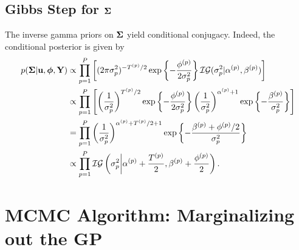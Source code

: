 \documentclass[12pt]{article}
\newcommand{\bphi}{\boldsymbol{\phi}}
\begin{document}
\subsection{Gibbs Step for $\boldsymbol{\Sigma}$}
The inverse gamma priors on $\boldsymbol{\Sigma}$ yield conditional conjugacy. Indeed, the conditional posterior is given by 
\begin{align*}
p(\CovObs | \bpar, \bphi, \stateMat) 
&\propto \prod_{\objIdx=1}^{\Nobj} \left[(2\pi\sdObs^2_{\objIdx})^{-\indexObj{\Ntime}/2} \exp\left\{-\frac{\indexObj{\phi} }{2\sdObs^2_{\objIdx}} \right\} 
\mathcal{IG}(\sdObs^2_{\objIdx}| \indexObj{\IGShape}, \indexObj{\IGScale}) \right] \\
&\propto \prod_{\objIdx=1}^{\Nobj} \left[\left(\frac{1}{\sdObs^2_{\objIdx}}\right)^{\indexObj{\Ntime}/2} \exp\left\{-\frac{\indexObj{\phi} }{2\sdObs^2_{\objIdx}} \right\} 
 \left(\frac{1}{\sdObs^2_{\objIdx}}\right)^{\indexObj{\IGShape}+1} \exp\left\{-\frac{\indexObj{\IGScale}}{\sdObs^2_{\objIdx}} \right\}\right] \\
 &= \prod_{\objIdx=1}^{\Nobj} \left(\frac{1}{\sdObs^2_{\objIdx}}\right)^{\indexObj{\IGShape}+\indexObj{\Ntime}/2+1} \exp\left\{-\frac{\indexObj{\IGScale} + \indexObj{\phi}/2}{\sdObs^2_{\objIdx}} \right\} \\
 &\propto \prod_{\objIdx=1}^{\Nobj} \mathcal{IG}\left(\sdObs^2_{\objIdx} \bigg| \indexObj{\IGShape} + \frac{\indexObj{\Ntime}}{2}, \indexObj{\IGScale} + \frac{\indexObj{\phi}}{2} \right).
\end{align*}


\section{MCMC Algorithm: Marginalizing out the GP}
\end{document}

